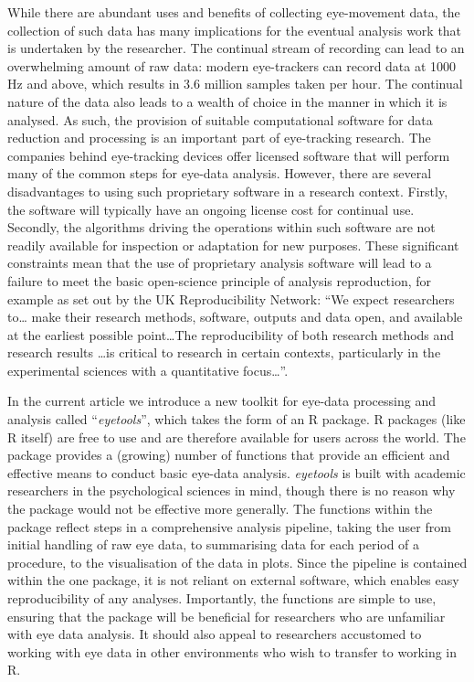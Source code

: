 \documentclass[
  man,
  floatsintext,
  longtable,
  nolmodern,
  notxfonts,
  notimes,
  colorlinks=true,linkcolor=blue,citecolor=blue,urlcolor=blue]{apa7}
\begin{document}
While there are abundant uses and benefits of collecting eye-movement
data, the collection of such data has many implications for the eventual
analysis work that is undertaken by the researcher. The continual stream
of recording can lead to an overwhelming amount of raw data: modern
eye-trackers can record data at 1000 Hz and above, which results in 3.6
million samples taken per hour. The continual nature of the data also
leads to a wealth of choice in the manner in which it is analysed. As
such, the provision of suitable computational software for data
reduction and processing is an important part of eye-tracking research.
The companies behind eye-tracking devices offer licensed software that
will perform many of the common steps for eye-data analysis. However,
there are several disadvantages to using such proprietary software in a
research context. Firstly, the software will typically have an ongoing
license cost for continual use. Secondly, the algorithms driving the
operations within such software are not readily available for inspection
or adaptation for new purposes. These significant constraints mean that
the use of proprietary analysis software will lead to a failure to meet
the basic open-science principle of analysis reproduction, for example
as set out by the UK Reproducibility Network: ``We expect researchers
to\ldots{} make their research methods, software, outputs and data open,
and available at the earliest possible point\ldots The reproducibility
of both research methods and research results \ldots is critical to
research in certain contexts, particularly in the experimental sciences
with a quantitative focus\ldots{}''.

In the current article we introduce a new toolkit for eye-data
processing and analysis called ``\emph{eyetools}'', which takes the form
of an R package. R packages (like R itself) are free to use and are
therefore available for users across the world. The package provides a
(growing) number of functions that provide an efficient and effective
means to conduct basic eye-data analysis. \emph{eyetools} is built with
academic researchers in the psychological sciences in mind, though there
is no reason why the package would not be effective more generally. The
functions within the package reflect steps in a comprehensive analysis
pipeline, taking the user from initial handling of raw eye data, to
summarising data for each period of a procedure, to the visualisation of
the data in plots. Since the pipeline is contained within the one
package, it is not reliant on external software, which enables easy
reproducibility of any analyses. Importantly, the functions are simple
to use, ensuring that the package will be beneficial for researchers who
are unfamiliar with eye data analysis. It should also appeal to
researchers accustomed to working with eye data in other environments
who wish to transfer to working in R.
\end{document}
